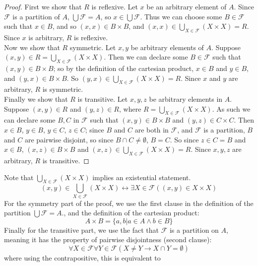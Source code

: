 \documentclass{report}
\theoremstyle{definition}
\begin{document}
\begin{proof}
First we show that $R$ is reflexive. Let $x$ be an arbitrary element of $A$. Since $\mathcal F$ is a partition of $A$, $\bigcup\mathcal F=A$, so $x\in\bigcup\mathcal F$. Thus we can choose some 
$B\in\mathcal F$ such that $x\in B$, and so $(x,x)\in B\times B$, and $(x,x)\in\bigcup_{X\in\mathcal F}(X\times X)=R$. Since $x$ is arbitrary, $R$ is reflexive.\\
\indent Now we show that $R$ symmetric. Let $x,y$ be arbitrary elements of $A$. Suppose $(x,y)\in R=\bigcup_{X\in\mathcal F}(X\times X)$. Then we can declare some $B\in\mathcal F$ such that 
$(x,y)\in B\times B$; so by the definition of the cartesian product, $x\in B$ and $y\in B$, and $(y,x)\in B\times B$. So $(y,x)\in\bigcup_{X\in\mathcal F}(X\times X)=R$. Since $x$ and $y$ are
arbitrary, $R$ is symmetric.\\
\indent Finally we show that $R$ is transitive. Let $x,y,z$ be arbitrary elements in $A$. Suppose $(x,y)\in R$ and $(y,z)\in R$, where $R=\bigcup_{X\in\mathcal F}(X\times X)$. 
As such we can declare some $B,C$ in $\mathcal F$ such that $(x,y)\in B\times B$ and $(y,z)\in C\times C$.
Then $x\in B$, $y\in B$, $y\in C$, $z\in C$; since $B$ and $C$ are both in $\mathcal F$, and $\mathcal F$ is a partition, $B$ and $C$ are pairwise disjoint, so since $B\cap C\neq\emptyset$, $B=C$.
So since $z\in C=B$ and $x\in B$, $(x,z)\in B\times B$ and $(x,z)\in\bigcup_{X\in\mathcal F}(X\times X)=R$. Since $x,y,z$ are arbitrary, $R$ is transitive.
\end{proof}
\noindent Note that $\bigcup_{X\in\mathcal F}(X\times X)$ implies an existential statement.
\begin{equation*}
(x,y)\in\bigcup_{X\in\mathcal F}(X\times X)\leftrightarrow\exists X\in\mathcal F((x,y)\in X\times X)
\end{equation*}
For the symmetry part of the proof, we use the first clause in the definition of the partition $\bigcup\mathcal F=A$., and the definition of the cartesian product:
\begin{equation*}
A\times B=\{a,b|a\in A\land b\in B\}
\end{equation*}
Finally for the transitive part, we use the fact that $\mathcal F$ is a partition on $A$, meaning it has the property of pairwise disjointness (second clause):
\begin{equation*}
\forall X\in\mathcal F\forall Y\in\mathcal F(X\neq Y\to X\cap Y=\emptyset)
\end{equation*}
where using the contrapositive, this is equivalent to
\end{document}
